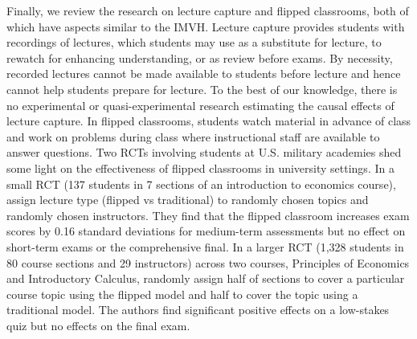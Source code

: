 \documentclass[12pt]{article}
\begin{document}
Finally, we review the research on lecture capture and flipped classrooms, both of which have aspects similar to the IMVH. Lecture capture provides students with recordings of lectures, which students may use as a substitute for lecture, to rewatch for enhancing understanding, or as review before exams. By necessity, recorded lectures cannot be made available to students before lecture and hence cannot help students prepare for lecture. To the best of our knowledge, there is no experimental or quasi-experimental research estimating the causal effects of lecture capture. In flipped classrooms, students watch material in advance of class and work on problems during class where instructional staff are available to answer questions. Two RCTs involving students at U.S. military academies shed some light on the effectiveness of flipped classrooms in university settings. In a small RCT (137 students in 7 sections of an introduction to economics course), \textcite{wbi2018} assign lecture type (flipped vs traditional) to randomly chosen topics and randomly chosen instructors. They find that the flipped classroom increases exam scores by 0.16 standard deviations for medium-term assessments but no effect on short-term exams or the comprehensive final. In a larger RCT (1,328 students in 80 course sections and 29 instructors) across two courses, Principles of Economics and Introductory Calculus, \textcite{sgmy2021} randomly assign half of sections to cover a particular course topic using the flipped model and half to cover the topic using a traditional model. The authors find significant positive effects on a low-stakes quiz but no effects on the final exam.



\end{document}
